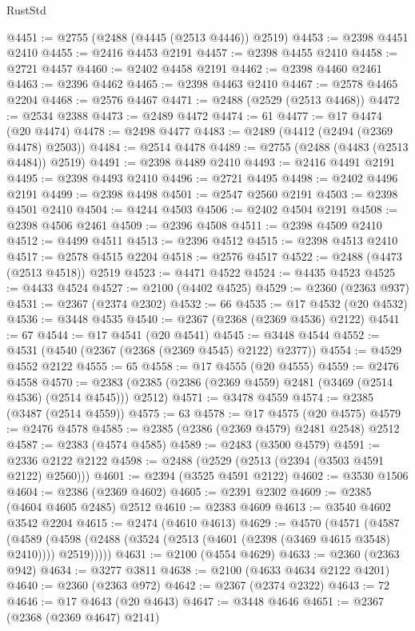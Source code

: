 \begin{lexlean}{RustStd}
\begin{coremodule}
@4451 := @2755 (@2488 (@4445 (@2513 @4446)) @2519)
@4453 := @2398 @4451 @2410
@4455 := @2416 @4453 @2191
@4457 := @2398 @4455 @2410
@4458 := @2721 @4457
@4460 := @2402 @4458 @2191
@4462 := @2398 @4460 @2461
@4463 := @2396 @4462
@4465 := @2398 @4463 @2410
@4467 := @2578 @4465 @2204
@4468 := @2576 @4467
@4471 := @2488 (@2529 (@2513 @4468))
@4472 := @2534 @2388
@4473 := @2489 @4472
@4474 := 61
@4477 := @17 @4474 (@20 @4474)
@4478 := @2498 @4477
@4483 := @2489 (@4412 (@2494 (@2369 @4478) @2503))
@4484 := @2514 @4478
@4489 := @2755 (@2488 (@4483 (@2513 @4484)) @2519)
@4491 := @2398 @4489 @2410
@4493 := @2416 @4491 @2191
@4495 := @2398 @4493 @2410
@4496 := @2721 @4495
@4498 := @2402 @4496 @2191
@4499 := @2398 @4498
@4501 := @2547 @2560 @2191
@4503 := @2398 @4501 @2410
@4504 := @4244 @4503
@4506 := @2402 @4504 @2191
@4508 := @2398 @4506 @2461
@4509 := @2396 @4508
@4511 := @2398 @4509 @2410
@4512 := @4499 @4511
@4513 := @2396 @4512
@4515 := @2398 @4513 @2410
@4517 := @2578 @4515 @2204
@4518 := @2576 @4517
@4522 := @2488 (@4473 (@2513 @4518)) @2519
@4523 := @4471 @4522
@4524 := @4435 @4523
@4525 := @4433 @4524
@4527 := @2100 (@4402 @4525)
@4529 := @2360 (@2363 @937)
@4531 := @2367 (@2374 @2302)
@4532 := 66
@4535 := @17 @4532 (@20 @4532)
@4536 := @3448 @4535
@4540 := @2367 (@2368 (@2369 @4536) @2122)
@4541 := 67
@4544 := @17 @4541 (@20 @4541)
@4545 := @3448 @4544
@4552 := @4531 (@4540 (@2367 (@2368 (@2369 @4545) @2122) @2377))
@4554 := @4529 @4552 @2122
@4555 := 65
@4558 := @17 @4555 (@20 @4555)
@4559 := @2476 @4558
@4570 := @2383 (@2385 (@2386 (@2369 @4559) @2481 (@3469 (@2514 @4536) (@2514 @4545))) @2512)
@4571 := @3478 @4559
@4574 := @2385 (@3487 (@2514 @4559))
@4575 := 63
@4578 := @17 @4575 (@20 @4575)
@4579 := @2476 @4578
@4585 := @2385 (@2386 (@2369 @4579) @2481 @2548) @2512
@4587 := @2383 (@4574 @4585)
@4589 := @2483 (@3500 @4579)
@4591 := @2336 @2122 @2122
@4598 := @2488 (@2529 (@2513 (@2394 (@3503 @4591 @2122) @2560)))
@4601 := @2394 (@3525 @4591 @2122)
@4602 := @3530 @1506
@4604 := @2386 (@2369 @4602)
@4605 := @2391 @2302
@4609 := @2385 (@4604 @4605 @2485) @2512
@4610 := @2383 @4609
@4613 := @3540 @4602 @3542 @2204
@4615 := @2474 (@4610 @4613)
@4629 := @4570
    (@4571
      (@4587
        (@4589 (@4598 (@2488 (@3524 (@2513 (@4601 (@2398 (@3469 @4615 @3548) @2410)))) @2519)))))
@4631 := @2100 (@4554 @4629)
@4633 := @2360 (@2363 @942)
@4634 := @3277 @3811
@4638 := @2100 (@4633 @4634 @2122 @4201)
@4640 := @2360 (@2363 @972)
@4642 := @2367 (@2374 @2322)
@4643 := 72
@4646 := @17 @4643 (@20 @4643)
@4647 := @3448 @4646
@4651 := @2367 (@2368 (@2369 @4647) @2141)

\end{coremodule}
\end{lexlean}
